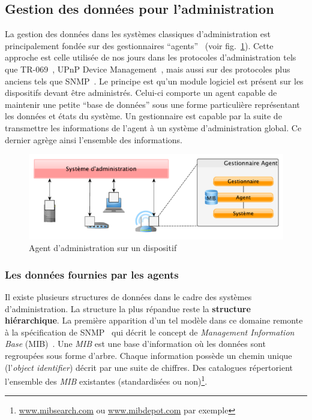 \subsection{Gestion des données pour l'administration}
La gestion des données dans les systèmes classiques d'administration est principalement fondée sur des gestionnaires \enquote{agents}~\cite{CCITT:X700} (voir fig.~\ref{fig:rw:supervision:administration}). Cette approche est celle utilisée de nos jours dans les protocoles d'administration tels que TR-069~\cite{BBF:tr069}, UPnP Device Management~\cite{UPnP:DM2}, mais aussi sur des protocoles plus anciens tels que SNMP~\cite{IETF:SNMP}. Le principe est qu'un module logiciel est présent sur les dispositifs devant être administrés. Celui-ci comporte un agent capable de maintenir une petite \enquote{base de données} sous une forme particulière représentant les données et états du système. Un gestionnaire est capable par la suite de transmettre les informations de l'agent à un système d'administration global. Ce dernier agrège ainsi l'ensemble des informations.
\begin{figure}[ht]
    \centering
    \includegraphics[width=.70\textwidth]{fig/rw-supervision-administration}
    \caption{Agent d'administration sur un dispositif}\label{fig:rw:supervision:administration}
\end{figure}

\subsubsection{Les données fournies par les agents}
Il existe plusieurs structures de données dans le cadre des systèmes d'administration. La structure la plus répandue reste la \textbf{structure hiérarchique}. La première apparition d'un tel modèle dans ce domaine remonte à la spécification de SNMP~\cite{IETF:SNMP} qui décrit le concept de \textit{Management Information Base} (MIB)~\cite{IETF:MIB}. Une \textit{MIB} est une base d'information où les données sont regroupées sous forme d'arbre. Chaque information possède un chemin unique (l'\textit{object identifier}) décrit par une suite de chiffres. Des catalogues répertorient l'ensemble des \textit{MIB} existantes (standardisées ou non)\footnote{\url{www.mibsearch.com} ou \url{www.mibdepot.com} par exemple}.

